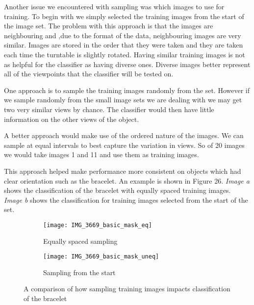 \documentclass[12pt]{IIBproject}
\begin{document}
Another issue we encountered with sampling was which images to use for training. To begin with we simply selected the training images from the start of the image set. The problem with this approach is that the images are neighbouring and ,due to the format of the data, neighbouring images are very similar. Images are stored in the order that they were taken and they are taken each time the turntable is slightly rotated. Having similar training images is not as helpful for the classifier as having diverse ones. Diverse images better represent all of the viewpoints that the classifier will be tested on. 

One approach is to sample the training images randomly from the set. However if we sample randomly from the small image sets we are dealing with we may get two very similar views by chance. The classifier would then have little information on the other views of the object. 

A better approach would make use of the ordered nature of the images. We can sample at equal intervals to best capture the variation in views. So of 20 images we would take images 1 and 11 and use them as training images.

This approach helped make performance more consistent on objects which had clear orientation such as the bracelet. An example is shown in Figure 26. \emph{Image a} shows the classification of the bracelet with equally spaced training images. \emph{Image b} shows the classification for training images selected from the start of the set. 
\begin{figure}[H]
\centering
\begin{subfigure}{.45\textwidth}
  \centering
  \texttt{[image: IMG\_3669\_basic\_mask\_eq]}
  \caption{Equally spaced sampling}
  \label{fig:sub2}
\end{subfigure}
\begin{subfigure}{.45\textwidth}
  \centering
  \texttt{[image: IMG\_3669\_basic\_mask\_uneq]}
  \caption{Sampling from the start}
  \label{fig:sub1}
\end{subfigure}%


\caption{A comparison of how sampling training images impacts classification of the bracelet}
\label{fig:test}
\end{figure}
\end{document}
